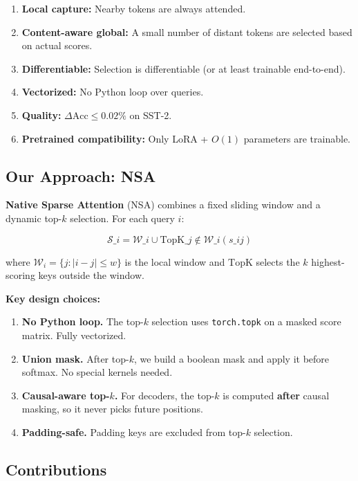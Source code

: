\begin{enumerate}
\item \textbf{Local capture:} Nearby tokens are always attended.
\item \textbf{Content-aware global:} A small number of distant tokens are selected
  based on actual scores.
\item \textbf{Differentiable:} Selection is differentiable (or at least
  trainable end-to-end).
\item \textbf{Vectorized:} No Python loop over queries.
\item \textbf{Quality:} $\Delta\text{Acc} \leq 0.02\%$ on SST-2.
\item \textbf{Pretrained compatibility:} Only LoRA + $O(1)$ parameters are trainable.

\end{enumerate}
\subsection{Our Approach: NSA}

\textbf{Native Sparse Attention} (NSA) combines a fixed sliding window and a 
dynamic top-$k$ selection. For each query $i$:

\[
\mathcal{S}\_i = \mathcal{W}\_i \cup \text{TopK}\_{j \notin \mathcal{W}\_i}(s\_{ij})
\tag{1.1}
\]

where $\mathcal{W}_i = \{j : |i - j| \leq w\}$ is the local window and 
$\text{TopK}$ selects the $k$ highest-scoring keys outside the window.

\textbf{Key design choices:}

\begin{enumerate}
\item \textbf{No Python loop.} The top-$k$ selection uses \texttt{torch.topk} on a
  masked score matrix. Fully vectorized.
\item \textbf{Union mask.} After top-$k$, we build a boolean mask and apply it
  before softmax. No special kernels needed.
\item \textbf{Causal-aware top-$k$.} For decoders, the top-$k$ is computed
  \textbf{after} causal masking, so it never picks future positions.
\item \textbf{Padding-safe.} Padding keys are excluded from top-$k$ selection.

\end{enumerate}
\subsection{Contributions}

